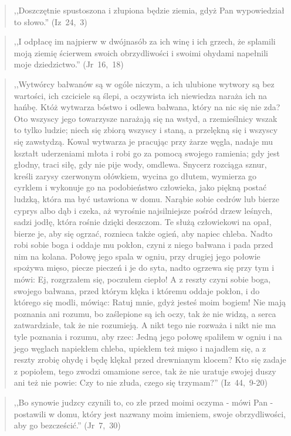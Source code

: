 \documentclass[10pt,a4paper,oneside]{article}
\begin{document}
\begin{quote}
,,Doszczętnie spustoszona i złupiona będzie ziemia, gdyż Pan wypowiedział to słowo.'' (Iz~24,~3)
\end{quote}
\begin{quote}
,,I odpłacę im najpierw w dwójnasób za ich winę i ich grzech, że splamili moją ziemię ścierwem swoich obrzydliwości i swoimi ohydami napełnili moje dziedzictwo.'' (Jr~16,~18)
\end{quote}
\begin{quote}
,,Wytwórcy bałwanów są w ogóle niczym, a ich ulubione wytwory są bez wartości, ich czciciele są ślepi, a oczywista ich niewiedza naraża ich na hańbę. Któż wytwarza bóstwo i odlewa bałwana, który na nic się nie zda? Oto wszyscy jego towarzysze narażają się na wstyd, a rzemieślnicy wszak to tylko ludzie; niech się zbiorą wszyscy i staną, a przelękną się i wszyscy się zawstydzą. Kowal wytwarza je pracując przy żarze węgla, nadaje mu kształt uderzeniami młota i robi go za pomocą swojego ramienia; gdy jest głodny, traci siłę, gdy nie pije wody, omdlewa. Snycerz rozciąga sznur, kreśli zarysy czerwonym ołówkiem, wycina go dłutem, wymierza go cyrklem i wykonuje go na podobieństwo człowieka, jako piękną postać ludzką, która ma być ustawiona w domu. Narąbie sobie cedrów lub bierze cyprys albo dąb i czeka, aż wyrośnie najsilniejsze pośród drzew leśnych, sadzi jodłę, która rośnie dzięki deszczom. Te służą człowiekowi na opał, bierze je, aby się ogrzać, roznieca także ogień, aby napiec chleba. Nadto robi sobie boga i oddaje mu pokłon, czyni z niego bałwana i pada przed nim na kolana. Połowę jego spala w ogniu, przy drugiej jego połowie spożywa mięso, piecze pieczeń i je do syta, nadto ogrzewa się przy tym i mówi: Ej, rozgrzałem się, poczułem ciepło! A z reszty czyni sobie boga, swojego bałwana, przed którym klęka i któremu oddaje pokłon, i do którego się modli, mówiąc: Ratuj mnie, gdyż jesteś moim bogiem! Nie mają poznania ani rozumu, bo zaślepione są ich oczy, tak że nie widzą, a serca zatwardziałe, tak że nie rozumieją. A nikt tego nie rozważa i nikt nie ma tyle poznania i rozumu, aby rzec: Jedną jego połowę spaliłem w ogniu i na jego węglach napiekłem chleba, upiekłem też mięso i najadłem się, a z reszty zrobię ohydę i będę klękał przed drewnianym klocem? Kto się zadaje z popiołem, tego zwodzi omamione serce, tak że nie uratuje swojej duszy ani też nie powie: Czy to nie złuda, czego się trzymam?'' (Iz~44,~9-20)
\end{quote}
\begin{quote}
,,Bo synowie judzcy czynili to, co złe przed moimi oczyma - mówi Pan - postawili w domu, który jest nazwany moim imieniem, swoje obrzydliwości, aby go bezcześcić.'' (Jr~7,~30)
\end{quote}
\end{document}
